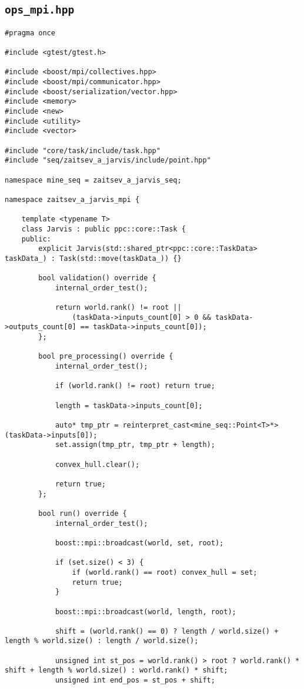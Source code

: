 \documentclass[12pt]{article}
\begin{document}
\subsection{\texttt{ops\_mpi.hpp}}
\begin{lstlisting}
#pragma once

#include <gtest/gtest.h>

#include <boost/mpi/collectives.hpp>
#include <boost/mpi/communicator.hpp>
#include <boost/serialization/vector.hpp>
#include <memory>
#include <new>
#include <utility>
#include <vector>

#include "core/task/include/task.hpp"
#include "seq/zaitsev_a_jarvis/include/point.hpp"

namespace mine_seq = zaitsev_a_jarvis_seq;

namespace zaitsev_a_jarvis_mpi {

	template <typename T>
	class Jarvis : public ppc::core::Task {
	public:
		explicit Jarvis(std::shared_ptr<ppc::core::TaskData> taskData_) : Task(std::move(taskData_)) {}

		bool validation() override {
			internal_order_test();

			return world.rank() != root ||
				(taskData->inputs_count[0] > 0 && taskData->outputs_count[0] == taskData->inputs_count[0]);
		};

		bool pre_processing() override {
			internal_order_test();

			if (world.rank() != root) return true;

			length = taskData->inputs_count[0];

			auto* tmp_ptr = reinterpret_cast<mine_seq::Point<T>*>(taskData->inputs[0]);
			set.assign(tmp_ptr, tmp_ptr + length);

			convex_hull.clear();

			return true;
		};

		bool run() override {
			internal_order_test();

			boost::mpi::broadcast(world, set, root);

			if (set.size() < 3) {
				if (world.rank() == root) convex_hull = set;
				return true;
			}

			boost::mpi::broadcast(world, length, root);

			shift = (world.rank() == 0) ? length / world.size() + length % world.size() : length / world.size();

			unsigned int st_pos = world.rank() > root ? world.rank() * shift + length % world.size() : world.rank() * shift;
			unsigned int end_pos = st_pos + shift;


\end{lstlisting}
\end{document}
